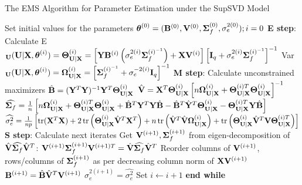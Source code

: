 \documentclass[11pt]{llncs}
\begin{document}
\begin{algorithm}
\caption{The EMS Algorithm for Parameter Estimation under the SupSVD Model}
\begin{algorithmic}[1]
\State Set initial values for the parameters ${\boldsymbol{\theta}}^{(0)} = ({\mathbf{B}}^{(0)},{\mathbf{V}}^{(0)},{\boldsymbol{\Sigma}}_f^{(0)},\sigma_e^{2(0)}); i=0$
\vspace{.2cm}
\State \textbf{E step}: Calculate
\State \hspace{.5cm}E$_{{\mathbf{U}}} ({\mathbf{U}}|{\mathbf{X}},{\boldsymbol{\theta}}^{(i)}) = {\boldsymbol{\Theta}}_{{\mathbf{U}}|{\mathbf{X}}}^{(i)} = \left[{\mathbf{Y}}{\mathbf{B}}^{(i)}\left(\sigma_e^{2(i)}{\boldsymbol{\Sigma}}_f^{(i)^{-1}}\right)+{\mathbf{X}}{\mathbf{V}}^{(i)}\right]\left[{\mathbf{I}}_q+\sigma_e^{2(i)}{\boldsymbol{\Sigma}}_f^{(i)^{-1}}\right]^{-1}$
\State \hspace{.5cm}Var$_{{\mathbf{U}}} ({\mathbf{U}}|{\mathbf{X}},{\boldsymbol{\theta}}^{(i)}) = {\boldsymbol{\Omega}}_{{\mathbf{U}}|{\mathbf{X}}}^{(i)} = \left[{\boldsymbol{\Sigma}}_f^{(i)^{-1}}+\sigma_e^{-2(i)}{\mathbf{I}}_q\right]^{-1}$
\vspace{.2cm}
\State \textbf{M step}: Calculate unconstrained maximizers
\State \hspace{.5cm}$\hat{{\mathbf{B}}} = ({\mathbf{Y}}^T{\mathbf{Y}})^{-1}{\mathbf{Y}}^T{\boldsymbol{\Theta}}_{{\mathbf{U}}|{\mathbf{X}}}^{(i)}$
\State \hspace{.5cm}$\hat{{\mathbf{V}}} = {\mathbf{X}}^T{\boldsymbol{\Theta}}_{{\mathbf{U}}|{\mathbf{X}}}^{(i)}\left[n{\boldsymbol{\Omega}}_{{\mathbf{U}}|{\mathbf{X}}}^{(i)} + {\boldsymbol{\Theta}}_{{\mathbf{U}}|{\mathbf{X}}}^{(i)T}{\boldsymbol{\Theta}}_{{\mathbf{U}}|{\mathbf{X}}}^{(i)}\right]^{-1} $
\State \hspace{.5cm}$\widehat{{\boldsymbol{\Sigma}}_f} = \frac{1}{n}\left[n{\boldsymbol{\Omega}}_{{\mathbf{U}}|{\mathbf{X}}}^{(i)} + {\boldsymbol{\Theta}}_{{\mathbf{U}}|{\mathbf{X}}}^{(i)T}{\boldsymbol{\Theta}}_{{\mathbf{U}}|{\mathbf{X}}}^{(i)} + \hat{{\mathbf{B}}}^T{\mathbf{Y}}^T{\mathbf{Y}}\hat{{\mathbf{B}}} - \hat{{\mathbf{B}}}^T\hat{{\mathbf{Y}}}^T{\boldsymbol{\Theta}}_{{\mathbf{U}}|{\mathbf{X}}}^{(i)} - {\boldsymbol{\Theta}}_{{\mathbf{U}}|{\mathbf{X}}}^{(i)T}{\mathbf{Y}}\hat{{\mathbf{B}}}\right]$
\State \hspace{.5cm}$\widehat{\sigma_e^2} = \frac{1}{np}\left[\operatorname*{tr}({\mathbf{X}}^T{\mathbf{X}}) + 2\operatorname*{tr}\left({\boldsymbol{\Theta}}_{{\mathbf{U}}|{\mathbf{X}}}^{(i)}\hat{{\mathbf{V}}}^T{\mathbf{X}}^T\right) + n\operatorname*{tr}\left(\hat{{\mathbf{V}}}^T\hat{{\mathbf{V}}}{\boldsymbol{\Omega}}_{{\mathbf{U}}|{\mathbf{X}}}^{(i)}\right) + \operatorname*{tr}\left({\boldsymbol{\Theta}}_{{\mathbf{U}}|{\mathbf{X}}}^{(i)}\hat{{\mathbf{V}}}^T{\mathbf{V}}{\boldsymbol{\Theta}}_{{\mathbf{U}}|{\mathbf{X}}}^{(i)T}\right)\right]$
\vspace{.2cm}
\State \textbf{S step}: Calculate next iterates
\State \hspace{.5cm}Get ${\mathbf{V}}^{(i+1)},{\boldsymbol{\Sigma}}_f^{(i+1)}$ from eigen-decomposition of $\hat{{\mathbf{V}}}\widehat{{\boldsymbol{\Sigma}}_f}\hat{{\mathbf{V}}}^T$: ${\mathbf{V}}^{(i+1)}{\boldsymbol{\Sigma}}_f^{(i+1)}{\mathbf{V}}^{(i+1)T} = \hat{{\mathbf{V}}}\widehat{{\boldsymbol{\Sigma}}_f}\hat{{\mathbf{V}}}^T$
\State \hspace{.5cm}Reorder columns of ${\mathbf{V}}^{(i+1)}$, rows/columns of ${\boldsymbol{\Sigma}}_f^{(i+1)}$ as per decreasing column norm of ${\mathbf{X}}{\mathbf{V}}^{(i+1)}$
\State \hspace{.5cm}${\mathbf{B}}^{(i+1)} = \hat{{\mathbf{B}}}\hat{{\mathbf{V}}}^T{\mathbf{V}}^{(i+1)}$
\State \hspace{.5cm}$\sigma_e^{2(i+1)} = \widehat{\sigma_e^2}$
\vspace{.2cm}
\State Set $i\leftarrow i+1$
\EndWhile
\State \textbf{end while}
\EndProcedure
\end{algorithmic}
\end{algorithm}
\end{document}
